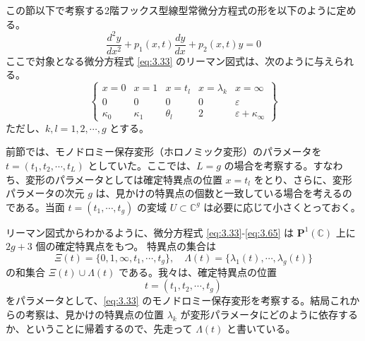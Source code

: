 
\begin{story}
\begin{definition}[ガルニエ系を導くフックス型常微分方程式とリーマン図式]
この節以下で考察する2階フックス型線型常微分方程式の形を以下のように定める。
\begin{equation}
\frac{d^2 y}{dx^2} + p_1(x, t) \frac{dy}{dx} + p_2(x, t) y = 0
\end{equation}
ここで対象となる微分方程式 \eqref{eq:3.33} のリーマン図式は、次のように与えられる。
\begin{equation}
\left\{
\begin{array}{ccccc}
x=0 & x=1 & x=t_l & x=\lambda_k & x=\infty \\
0 & 0 & 0 & 0 & \varepsilon \\
\kappa_0 & \kappa_1 & \theta_l & 2 & \varepsilon+\kappa_\infty
\end{array}
\right\} \label{eq:3.65}
\end{equation}
ただし、$k, l = 1, 2, \cdots, g$ とする。
\end{definition}

前節では、モノドロミー保存変形（ホロノミック変形）のパラメータを $t = (t_1, t_2, \cdots, t_L)$ としていた。ここでは、$L=g$ の場合を考察する。すなわち、変形のパラメータとしては確定特異点の位置 $x=t_l$ をとり、さらに、変形パラメータの次元 $g$ は、見かけの特異点の個数と一致している場合を考えるのである。当面 $t=(t_1, \cdots, t_g)$ の変域 $U \subset \mathbb{C}^g$ は必要に応じて小さくとっておく。

リーマン図式からわかるように、微分方程式 \eqref{eq:3.33}-\eqref{eq:3.65} は $\mathbf{P}^1(\mathbb{C})$ 上に $2g+3$ 個の確定特異点をもつ。
特異点の集合は
\begin{equation*}
\Xi(t) = \{0, 1, \infty, t_1, \cdots, t_g\}, \quad \Lambda(t) = \{\lambda_1(t), \cdots, \lambda_g(t)\}
\end{equation*}
の和集合 $\Xi(t) \cup \Lambda(t)$ である。我々は、確定特異点の位置
\begin{equation*}
t = (t_1, t_2, \cdots, t_g)
\end{equation*}
をパラメータとして、\eqref{eq:3.33} のモノドロミー保存変形を考察する。結局これからの考察は、見かけの特異点の位置 $\lambda_k$ が変形パラメータにどのように依存するか、ということに帰着するので、先走って $\Lambda(t)$ と書いている。
\end{story}

